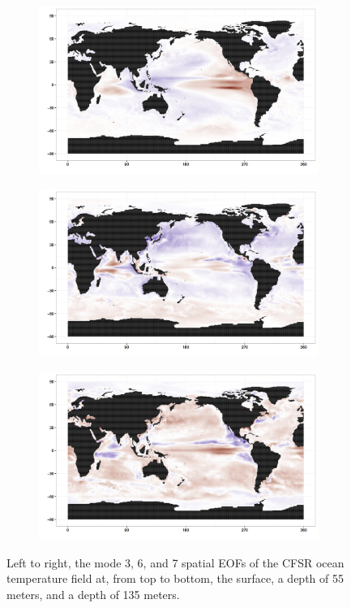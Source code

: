 \begin{figure}[h!bt]
\begin{subfigure}{.3\textwidth}
  \end{subfigure}
  \begin{subfigure}{.3\textwidth}
    \centering
    \includegraphics[width=.9\linewidth]{images/EOF3_135.png}
  \end{subfigure}
  \begin{subfigure}{.3\textwidth}
    \centering
    \includegraphics[width=.9\linewidth]{images/EOF6_135.png}
  \end{subfigure}
  \begin{subfigure}{.3\textwidth}
    \centering
    \includegraphics[width=.9\linewidth]{images/EOF7_135.png}
  \end{subfigure}
  \caption{Left to right, the mode 3, 6, and 7 spatial EOFs of the CFSR ocean temperature field at, from top to bottom, the surface, a depth of 55 meters, and a depth of 135 meters. }
  \label{fig:spatialEOFs}
\end{figure}

